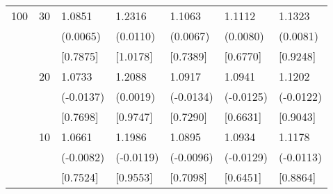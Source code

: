 \begin{table}[H]
{\begin{tabular}{c c | C{2.4cm} | C{2.4cm} | C{2.4cm} | C{2.4cm} | C{2.4cm} }
			\cmidrule(lr){1-7}
			100&30&1.0851&1.2316&1.1063&1.1112&1.1323\\
			&&(0.0065)&(0.0110)&(0.0067)&(0.0080)&(0.0081)\\
			&&[0.7875]&[1.0178]&[0.7389]&[0.6770]&[0.9248]\\
			&20&1.0733&1.2088&1.0917&1.0941&1.1202\\
			&&(-0.0137)&(0.0019)&(-0.0134)&(-0.0125)&(-0.0122)\\
			&&[0.7698]&[0.9747]&[0.7290]&[0.6631]&[0.9043]\\
			&10&1.0661&1.1986&1.0895&1.0934&1.1178\\
			&&(-0.0082)&(-0.0119)&(-0.0096)&(-0.0129)&(-0.0113)\\
			&&[0.7524]&[0.9553]&[0.7098]&[0.6451]&[0.8864]\\
			\bottomrule[1.5pt]
	\end{tabular}}
	\label{table:table S.2}
\end{table}

